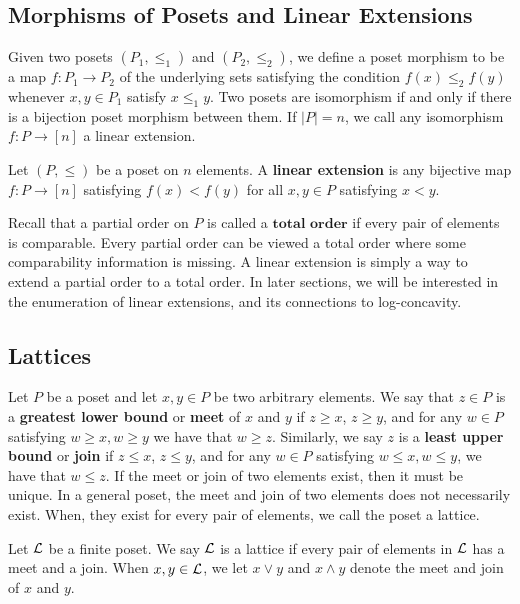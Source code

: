 \documentclass{puthesis-UG}
\begin{document}
\subsection{Morphisms of Posets and Linear Extensions}

Given two posets $(P_1, \leq_1)$ and $(P_2, \leq_2)$, we define a poset morphism to be a map $f : P_1 \to P_2$ of the underlying sets satisfying the condition $f(x) \leq_2 f(y)$ whenever $x, y \in P_1$ satisfy $x \leq_1 y$. Two posets are isomorphism if and only if there is a bijection poset morphism between them. If $|P| = n$, we call any isomorphism $f : P \to [n]$ a linear extension. 

\begin{defn} \label{defn:linear-extension}
	Let $(P, \leq)$ be a poset on $n$ elements. A \textbf{linear extension} is any bijective map $f : P \to [n]$ satisfying $f(x) < f(y)$ for all $x, y \in P$ satisfying $x < y$.
\end{defn}

Recall that a partial order on $P$ is called a $\textbf{total order}$ if every pair of elements is comparable. Every partial order can be viewed a total order where some comparability information is missing. A linear extension is simply a way to extend a partial order to a total order. In later sections, we will be interested in the enumeration of linear extensions, and its connections to log-concavity. 

\subsection{Lattices}

Let $P$ be a poset and let $x, y \in P$ be two arbitrary elements. We say that $z \in P$ is a \textbf{greatest lower bound} or \textbf{meet} of $x$ and $y$ if $z \geq x$, $z \geq y$, and for any $w \in P$ satisfying $w \geq x, w \geq y$ we have that $w \geq z$. Similarly, we say $z$ is a \textbf{least upper bound} or \textbf{join} if $z \leq x$, $z \leq y$, and for any $w \in P$ satisfying $w \leq x, w \leq y$, we have that $w \leq z$. If the meet or join of two elements exist, then it must be unique. In a general poset, the meet and join of two elements does not necessarily exist. When, they exist for every pair of elements, we call the poset a lattice. 

\begin{defn} \label{defn:lattice}
	Let $\mathcal{L}$ be a finite poset. We say $\mathcal{L}$ is a lattice if every pair of elements in $\mathcal{L}$ has a meet and a join. When $x, y \in \mathcal{L}$, we let $x \vee y$  and $x \wedge y$ denote the meet and join of $x$ and $y$. 
\end{defn}
\end{document}
